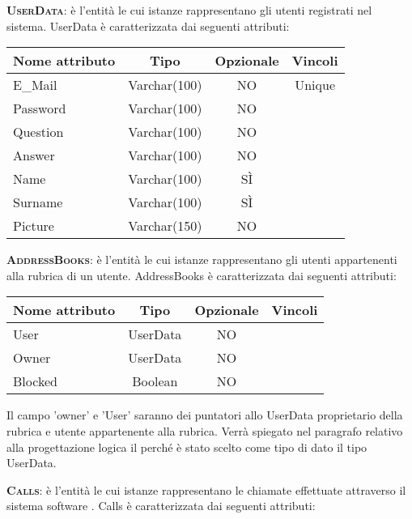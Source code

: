 \begin{description}
	\item{\scshape\bfseries UserData}: è l'entità le cui istanze rappresentano gli utenti registrati nel sistema. UserData è caratterizzata dai seguenti attributi:

\begin{center}
\begin{tabular}{lccc}
\toprule
Nome attributo & Tipo & Opzionale & Vincoli\\
\midrule
E\_Mail & Varchar(100) & NO & Unique\\
Password & Varchar(100) & NO &\\
Question & Varchar(100) & NO &\\
Answer & Varchar(100) & NO &\\
Name & Varchar(100) & SÌ &\\
Surname & Varchar(100) & SÌ &\\
Picture & Varchar(150) & NO &\\
\bottomrule
\end{tabular}
\end{center}

	\item{\scshape\bfseries AddressBooks}: è l'entità le cui istanze rappresentano gli utenti  appartenenti alla rubrica di un utente. AddressBooks è caratterizzata dai seguenti attributi:
	
\begin{center}
\begin{tabular}{lccc}
\toprule
Nome attributo & Tipo & Opzionale & Vincoli\\
\midrule
User & UserData & NO & \\
Owner & UserData & NO &\\
Blocked & Boolean & NO & \\
\bottomrule
\end{tabular}
\end{center}

Il campo 'owner' e 'User' saranno dei puntatori allo UserData proprietario della rubrica e utente appartenente alla rubrica. Verrà spiegato nel paragrafo relativo alla progettazione logica il perché è stato scelto come tipo di dato il tipo UserData.

	\item{\scshape\bfseries Calls}: è l'entità le cui istanze rappresentano le chiamate effettuate attraverso il sistema software \caName. Calls è caratterizzata dai seguenti attributi:


\end{description}
